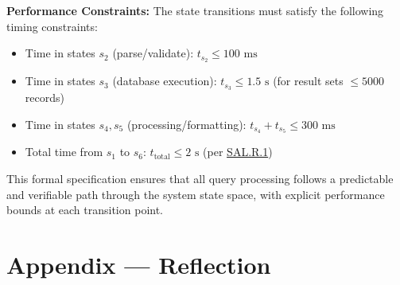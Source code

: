 \documentclass[12pt]{article}
\begin{document}
\par{\textbf{Performance Constraints:}
The state transitions must satisfy the following timing constraints:
\begin{itemize}
    \item Time in states $s_2$ (parse/validate): $t_{s_2} \leq 100\text{ ms}$
    \item Time in states $s_3$ (database execution): $t_{s_3} \leq 1.5\text{ s}$ (for result sets $\leq 5000$ records)
    \item Time in states $s_4, s_5$ (processing/formatting): $t_{s_4} + t_{s_5} \leq 300\text{ ms}$
    \item Total time from $s_1$ to $s_6$: $t_{\text{total}} \leq 2\text{ s}$ (per \hyperref[req:sal.r.1]{SAL.R.1})
\end{itemize}

This formal specification ensures that all query processing follows a predictable and verifiable path through the system state space, with explicit performance bounds at each transition point.
}

\newpage{}
\section*{Appendix --- Reflection}





\newpage


\end{document}
